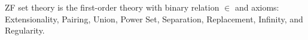ZF set theory is the first-order theory with binary relation $\in$ and axioms: Extensionality, Pairing, Union, Power Set, Separation, Replacement, Infinity, and Regularity.
